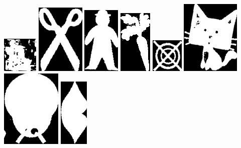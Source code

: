\documentclass[10pt,a4paper]{article}
\begin{document}
\begin{center}
\includegraphics[scale=0.25]{2.3/sign31.jpg}
\includegraphics[scale=0.25]{2.3/sign32.jpg}
\includegraphics[scale=0.25]{2.3/sign33.jpg}
\includegraphics[scale=0.25]{2.3/sign34.jpg}
\includegraphics[scale=0.25]{2.3/sign35.jpg}
\includegraphics[scale=0.25]{2.3/sign36.jpg}
\includegraphics[scale=0.25]{2.3/sign37.jpg}
\includegraphics[scale=0.25]{2.3/sign38.jpg}

\end{center}
\end{document}
